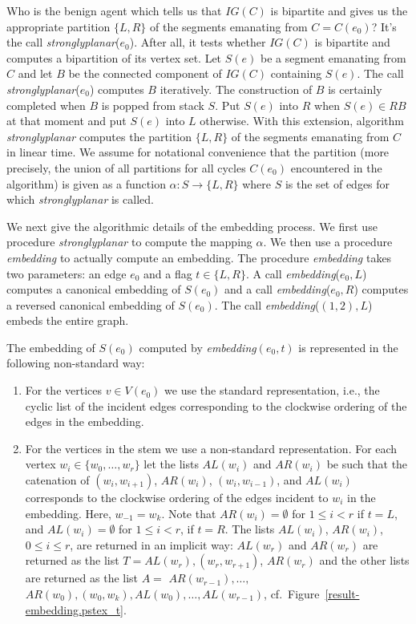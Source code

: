 Who is the benign agent which tells us that $IG(C)$ is bipartite and
gives us the appropriate partition $\{L,R\}$ of the segments emanating
from $C=C(e_0)$?
It's the call {\em stronglyplanar}($e_0$).
After all, it tests whether $IG(C)$ is bipartite and computes a
bipartition of its vertex set.
Let $S(e)$ be a segment emanating from $C$ and let $B$ be the connected
component of $IG(C)$ containing $S(e)$.
The call {\em stronglyplanar}($e_0$) computes $B$ iteratively.
The construction of $B$ is certainly completed when $B$ is popped from
stack $S$.
Put $S(e)$ into $R$ when $S(e)\in RB$ at that moment and put $S(e)$
into $L$ otherwise.
With this extension, algorithm {\em stronglyplanar} computes the
partition $\{L,R\}$ of the segments emanating from $C$ in linear time.
We assume for notational convenience that the partition (more precisely,
the union of all partitions for all cycles $C(e_0)$ encountered in the
algorithm) is given as a function $\alpha :S\to \{L,R\}$ where $S$ is
the set of edges for which {\em stronglyplanar} is called.

We next give the algorithmic details of the embedding process.
We first use procedure {\em stronglyplanar} to compute the mapping
$\alpha$.
We then use a procedure {\em embedding} to actually compute an
embedding.
The procedure {\em embedding} takes two parameters: an edge $e_0$ and
a flag $t\in \{L,R\}$.
A call {\em embedding}($e_0,L$) computes a canonical embedding of
$S(e_0)$ and a call {\em embedding}($e_0,R$) computes a reversed
canonical embedding of $S(e_0)$.
The call {\em embedding}($(1,2),L$) embeds the entire graph.

The embedding of $S(e_0)$ computed by {\em embedding}$(e_0,t)$ is
represented in the following non-standard way:
\begin{enumerate}
\item For the vertices $v\in V(e_0)$ we use the standard
representation, i.e., the cyclic list of the incident
edges corresponding to the clockwise ordering of the edges
in the embedding.
\item For the vertices in the stem we use a non-standard representation.
For each vertex $w_i\in\{w_0,\ldots,w_{r}\}$ let the lists
$AL(w_i)$ and $AR(w_i)$ be such that the catenation of
$(w_i,w_{i+1})$, $AR(w_i)$, $(w_i,w_{i-1})$, and
$AL(w_i)$ corresponds to the clockwise ordering of the edges
incident to $w_i$ in the embedding. Here, $w_{-1}=w_k$.
Note that $AR(w_i)=\emptyset$ for $1\leq i<r$ if $t=L$, and
$AL(w_i)=\emptyset$ for $1\leq i<r$, if $t=R$.
The lists $AL(w_i)$, $AR(w_i)$, $0\leq i\leq r$, are returned in an
implicit way: $AL(w_r)$ and $AR(w_r)$ are returned as the list
$T=AL(w_r),(w_r,w_{r+1})$, $AR(w_r)$ and the other lists
are returned as the list $A=$ $AR(w_{r-1}),\ldots,$
$AR(w_0),(w_0,w_k),AL(w_0),\ldots ,AL(w_{r-1})$,
cf.\ Figure~\ref{result-embedding.pstex_t}.
\end{enumerate}

